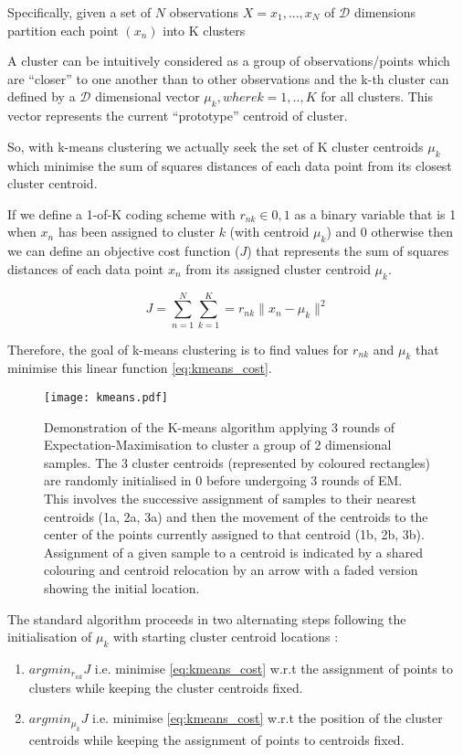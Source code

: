 Specifically, given a set of \(N\) observations \(X = {x_{1},...,x_{N}}\) 
of \(\mathcal{D}\) dimensions partition each point \((x_{n})\) into K clusters

A cluster can be intuitively considered as a group of observations/points which are 
``closer'' to one another than to other observations and the k-th cluster can 
defined by a \(\mathcal{D}\) dimensional vector \(\mu_{k}, where k=1,..,K\) for all clusters.
This vector represents the current ``prototype'' centroid of cluster. 

So, with k-means clustering we actually seek the set of K cluster centroids \({\mu_{k}}\) 
which minimise the sum of squares distances of each data point from its closest cluster centroid.
\citep{Bishop2006}

If we define a 1-of-K coding scheme with \(r_{nk} \in {0,1}\) as a binary variable that is 1 when \(x_{n}\) has been
assigned to cluster \(k\) (with centroid \(\mu_{k}\)) and 0 otherwise then we can define an objective cost function (\(J\)) 
that represents the sum of squares distances of each data point \(x_{n}\) from its assigned cluster centroid \(\mu_{k}\).

\[ 
    J = \sum_{n=1}^{N}\sum_{k=1}^{K} = r_{nk} \|x_{n} - \mu_{k}\|^{2}
    \label{eq:kmeans_cost}
\]

Therefore, the goal of k-means clustering is to find values for \({r_{nk}}\) and \({\mu_{k}}\) that minimise this linear 
function \ref{eq:kmeans_cost}.
\citep{Bishop2006}

\begin{figure}[h!]
    \texttt{[image: kmeans.pdf]}
    \caption[K-means clustering]{Demonstration of the K-means algorithm applying 3 rounds of Expectation-Maximisation to cluster
        a group of 2 dimensional samples.  The 3 cluster centroids (represented by coloured rectangles) 
        are randomly initialised in 0 before undergoing 3 rounds of EM.  
        This involves the successive assignment of samples to their nearest centroids (1a, 2a, 3a) 
and then the movement of the centroids to the center of the points currently assigned to that centroid (1b, 2b, 3b).
Assignment of a given sample to a centroid is indicated by a shared colouring and centroid relocation by
an arrow with a faded version showing the initial location.
}
    \label{fig:kmeans}
\end{figure}


The standard algorithm proceeds in two alternating steps following the initialisation of \(\mu_{k}\) with starting
cluster centroid locations \citep{Forgy1965,Lloyd1982}:
\begin{enumerate}
    \item \(argmin_{r_{nk}} J\) i.e. minimise \ref{eq:kmeans_cost} w.r.t the assignment of points to clusters while keeping
        the cluster centroids fixed.
    \item \(argmin_{\mu_{k}} J\) i.e. minimise \ref{eq:kmeans_cost} w.r.t the position of the cluster centroids while keeping
        the assignment of points to centroids fixed.
\end{enumerate}

